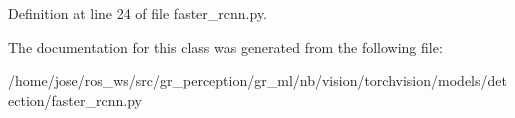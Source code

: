 Definition at line 24 of file faster\+\_\+rcnn.\+py.



The documentation for this class was generated from the following file\+:\begin{DoxyCompactItemize}
\item 
/home/jose/ros\+\_\+ws/src/gr\+\_\+perception/gr\+\_\+ml/nb/vision/torchvision/models/detection/faster\+\_\+rcnn.\+py\end{DoxyCompactItemize}
